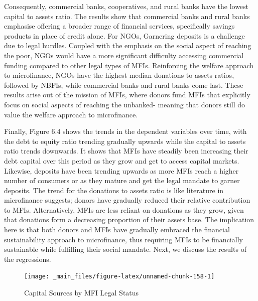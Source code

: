 \documentclass[a4paper, nobind]{templates/ociamthesis}
\begin{document}
Consequently, commercial banks, cooperatives, and rural banks have the lowest capital to assets ratio. The results show that commercial banks and rural banks emphasise offering a broader range of financial services, specifically savings products in place of credit alone. For NGOs, Garnering deposits is a challenge due to legal hurdles. Coupled with the emphasis on the social aspect of reaching the poor, NGOs would have a more significant difficulty accessing commercial funding compared to other legal types of MFIs. Reinforcing the welfare approach to microfinance, NGOs have the highest median donations to assets ratios, followed by NBFIs, while commercial banks and rural banks come last. These results arise out of the mission of MFIs, where donors fund MFIs that explicitly focus on social aspects of reaching the unbanked- meaning that donors still do value the welfare approach to microfinance.

Finally, Figure 6.4 shows the trends in the dependent variables over time, with the debt to equity ratio trending gradually upwards while the capital to assets ratio trends downwards. It shows that MFIs have steadily been increasing their debt capital over this period as they grow and get to access capital markets. Likewise, deposits have been trending upwards as more MFIs reach a higher number of consumers or as they mature and get the legal mandate to garner deposits. The trend for the donations to assets ratio is like literature in microfinance suggests; donors have gradually reduced their relative contribution to MFIs. Alternatively, MFIs are less reliant on donations as they grow, given that donations form a decreasing proportion of their assets base. The implication here is that both donors and MFIs have gradually embraced the financial sustainability approach to microfinance, thus requiring MFIs to be financially sustainable while fulfilling their social mandate. Next, we discuss the results of the regressions.

\begin{landscape}

\begin{figure}

{\centering \texttt{[image: \_main\_files/figure-latex/unnamed-chunk-158-1]} 

}

\caption{Capital Sources by MFI Legal Status}\label{fig:unnamed-chunk-158}
\end{figure}

\end{landscape}
\end{document}
